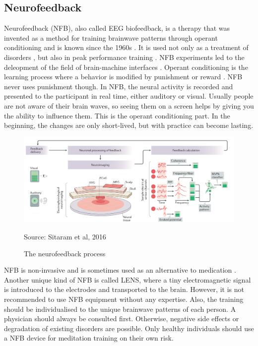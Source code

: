 \documentclass{llncs} %
\newcommand{\source}[1]{\hfill Source: {#1} }
\begin{document}
\subsection{Neurofeedback}
Neurofeedback (NFB), also called EEG biofeedback, is a therapy that was invented as a method for training brainwave patterns through operant conditioning and is known since the 1960s \cite{Hammond}. %
It is used not only as a treatment of disorders \cite{brand:del}, but also in peak performance training \cite{Kaufman}. NFB experiments led to the deleopment of the field of brain-machine interfaces \cite{Sitaram}.
Operant conditioning is the learning process where a behavior is modified by punishment or reward \cite{Spence}. NFB never uses punishment though. In NFB, the neural activity is recorded and presented to the participant in real time, either auditory or visual.  
Usually people are not aware of their brain waves, so seeing them on a screen helps by giving you the ability to influence them. This is the operant conditioning part. In the beginning, the changes are only short-lived, but with practice can become lasting. 

\begin{figure}
    \includegraphics[width=\linewidth]{Neurofeedback.png}
    \caption{The neurofeedback process}  \label{neurofeedback}
    \source{Sitaram et al, 2016}
\end{figure}

NFB is non-invasive and is sometimes used as an alternative to medication \cite{Hammond}. Another unique kind of NFB is called LENS, where a tiny electromagnetic signal is introduced to the electrodes and transported to the brain.
However, it is not recommended to use NFB equipment without any expertise. Also, the training should be individualised to the unique brainwave patterns of each person. A physician should always be consulted first.
Otherwise, negative side effects or degradation of existing disorders are possible. Only healthy individuals should use a NFB device for meditation training on their own risk.
\end{document}

